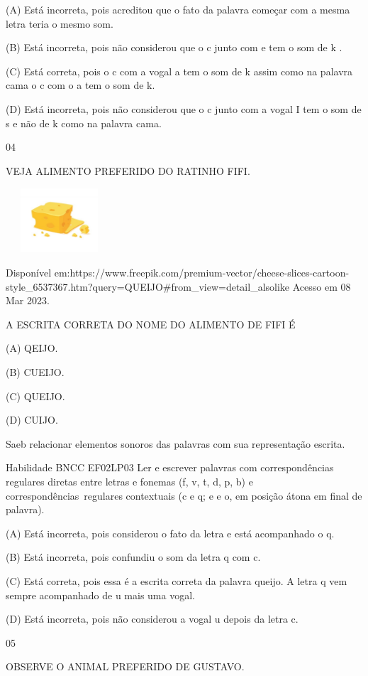 {{{{{{(A) Está incorreta, pois acreditou que o fato da palavra começar com a
mesma letra teria o mesmo som.

(B) Está incorreta, pois não considerou que o c junto com e tem o som de
k .

(C) Está correta, pois o c com a vogal a tem o som de k assim como na
palavra cama o c com o a tem o som de k.

(D) Está incorreta, pois não considerou que o c junto com a vogal I tem
o som de s e não de k como na palavra cama.

\num{04}

VEJA ALIMENTO PREFERIDO DO RATINHO FIFI.

\includegraphics[width=1.56736in,height=0.94861in]{media/image141.jpeg}

Disponível
em:https://www.freepik.com/premium-vector/cheese-slices-cartoon-style\_6537367.htm?query=QUEIJO\#from\_view=detail\_alsolike
Acesso em 08 Mar 2023.

A ESCRITA CORRETA DO NOME DO ALIMENTO DE FIFI É

(A) QEIJO.

(B) CUEIJO.

(C) QUEIJO.

(D) CUIJO.

Saeb relacionar elementos sonoros das palavras com sua representação
escrita.

Habilidade BNCC EF02LP03 Ler e escrever palavras com correspondências
regulares diretas entre letras e fonemas (f, v, t, d, p, b) e
correspondências~regulares contextuais (c e q; e e o, em posição átona
em final de palavra).

(A) Está incorreta, pois considerou o fato da letra e está acompanhado o
q.

(B) Está incorreta, pois confundiu o som da letra q com c.

(C) Está correta, pois essa é a escrita correta da palavra queijo. A
letra q vem sempre acompanhado de u mais uma vogal.

(D) Está incorreta, pois não considerou a vogal u depois da letra c.

\num{05}

OBSERVE O ANIMAL PREFERIDO DE GUSTAVO.

}}}}}}
